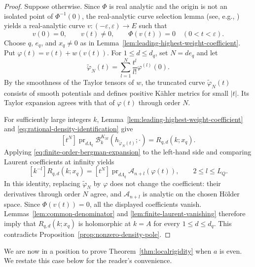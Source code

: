 \documentclass[11pt,reqno]{amsart}
\theoremstyle{corollary}
\theoremstyle{conjecture}
\theoremstyle{assumption}
\theoremstyle{proposition}
\theoremstyle{remark}
\numberwithin{equation}{section}
\begin{document}
\begin{proof}
Suppose otherwise. Since $\Phi$ is real analytic and the origin is not an isolated point of $\Phi^{-1}(0)$, the real-analytic curve selection lemma (see, e.g., \cite[p.~103]{Coltoiu1997}) yields a real-analytic curve $v\colon (-\varepsilon,\varepsilon)\to E$ such that
\[
v(0)=0,\qquad v(t)\neq 0,\qquad \Phi(v(t))=0\quad (0<t<\varepsilon).
\]
Choose $q$, $e_q$, and $x_q\neq 0$ as in Lemma~\ref{lem:leading-highest-weight-coefficient}. Put $\varphi(t)=v(t)+w(v(t))$. For $1\leq d\leq d_q$, set $N=de_q$ and let
\[
\widetilde\varphi_N(t)=\sum_{l=1}^{N}\frac{t^l}{l!}\varphi^{(l)}(0).
\]
By the smoothness of the Taylor tensors of $w$, the truncated curve $\widetilde\varphi_N(t)$ consists of smooth potentials and defines positive K\"ahler metrics for small $|t|$. Its Taylor expansion agrees with that of $\varphi(t)$ through order $N$.

For sufficiently large integers $k$, Lemma~\ref{lem:leading-highest-weight-coefficient} and \eqref{eq:rational-density-identification} give
\[
[t^N]\operatorname{pr}_{d\Lambda_q}\mathcal B_k^{K_M}(h_{\widetilde\varphi_N(t)};\cdot)=R_{q,d}(k;x_q).
\]
Applying \eqref{eq:finite-order-bergman-expansion} to the left-hand side and comparing Laurent coefficients at infinity yields
\[
[k^{-l}]R_{q,d}(k;x_q)=[t^N]\operatorname{pr}_{d\Lambda_q}\mathcal A_{n+l}(\varphi(t)),\qquad 2\leq l \leq L_Q.
\]
In this identity, replacing $\widetilde\varphi_N$ by $\varphi$ does not change the coefficient: their derivatives through order $N$ agree, and $\mathcal A_{n+l}$ is analytic on the chosen H\"older space. Since $\Phi(v(t))=0$, all the displayed coefficients vanish. Lemmas~\ref{lem:common-denominator} and \ref{lem:finite-laurent-vanishing} therefore imply that $R_{q,d}(k;x_q)$ is holomorphic at $k=A$ for every $1\leq d\leq d_q$. This contradicts Proposition~\ref{prop:nonzero-density-pole}.
\end{proof}

We are now in a position to prove Theorem~\ref{thm:localrigidity} when $a$ is even. We restate this case below for the reader's convenience.
\end{document}
